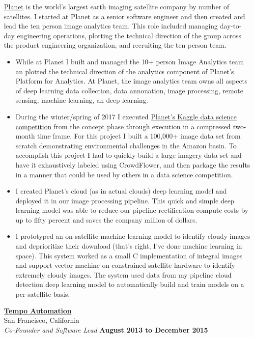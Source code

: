 \documentclass[10pt]{article}
\newenvironment{outerlist}[1][\enskip\textbullet]%
        {\begin{itemize}[#1]}{\end{itemize}%
         \vspace{-.6\baselineskip}}
\newcommand{\blankline}{\quad\pagebreak[2]}
\begin{document}
\blankline
\newline
\href{http://www.planet.com}{Planet} is the world's largest earth imaging satellite company by number of satellites. I started at Planet as a senior software engineer and then created and lead the ten person image analytics team. This role included managing day-to-day engineering operations, plotting the technical direction of the group across the product engineering organization, and recruiting the ten person team. 
\\
\begin{outerlist}
\item While at Planet I built and managed the 10+ person Image Analytics team an plotted the technical direction of the analytics component of Planet's Platform for Analytics. At Planet, the image analytics team owns all aspects of deep learning data collection, data annonation, image processing, remote sensing, machine learning, an deep learning.  
\item During the winter/spring of 2017 I executed \href{https://www.kaggle.com/c/planet-understanding-the-amazon-from-space}{Planet's Kaggle data science competition} from the concept phase through execution in a compressed two-month time frame. For this project I built a 100,000+ image data set from scratch demonstrating environmental challenges in the Amazon basin. To accomplish this project I had to quickly build a large imagery data set and have it exhaustively labeled using CrowdFlower, and then package the results in a manner that could be used by others in a data science competition.   
\item I created Planet's cloud (as in actual clouds) deep learning model and deployed it in our image processing pipeline. This quick and simple deep learning model was able to reduce our pipeline rectification compute costs by up to fifty percent and saves the company million of dollars. 
\item I prototyped an on-satellite machine learning model to identify cloudy images and deprioritize their download (that's right, I've done machine learning in space). This system worked as a small C implementation of integral images and support vector machine on constrained satellite hardware to identify extremely cloudy images. The system used data from my pipeline cloud detection deep learning model to automatically build and train models on a per-satellite basis.   
\end{outerlist}
\blankline
\newline
\href{http://www.tempoautomation.com/}{\textbf{Tempo Automation}} \\
San Francisco, California \\
\textit{Co-Founder and Software Lead}%
        \hfill \textbf{August 2013 to December 2015}  \\
\end{document}
